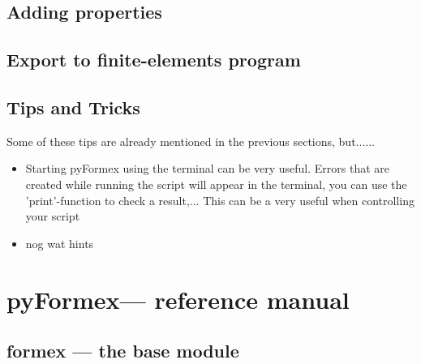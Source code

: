 \documentclass[a4paper]{manual}
\newcommand{\pyformex}{pyFormex\xspace}
\begin{document}
{%




%
\section{Adding properties}
\label{sec:props}


%
\section{Export to finite-elements program}


%
\section{Tips and Tricks}

Some of these tips are already mentioned in the previous sections, but......
\begin{itemize}
\item Starting \pyformex using the terminal can be very useful. Errors that are created while running the script will appear in the terminal, you can use the 'print'-function to check a result,... This can be a very useful when controlling your script
\item nog wat hints 
\end{itemize}





\chapter{\pyformex --- reference manual}
{\label{cha:reference}

\section{formex --- the base module}
{\label{sec:formex}

}}}
\end{document}
